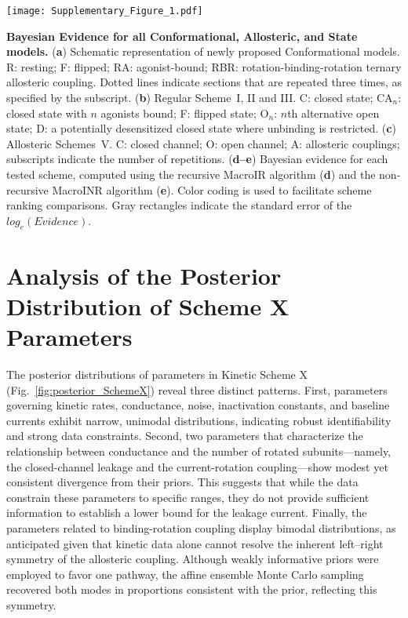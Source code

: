 \documentclass[pdflatex,sn-nature]{sn-jnl}%
\theoremstyle{thmstyleone}%
\theoremstyle{thmstyletwo}%
\theoremstyle{thmstylethree}%
\begin{document}
\begin{extfigure}[t]
	\centering
	\texttt{[image: Supplementary\_Figure\_1.pdf]}
	\caption{\textbf{Bayesian Evidence for all Conformational, Allosteric, and State models.}  
		(\textbf{a}) Schematic representation of newly proposed Conformational models. R: resting; F: flipped; RA: agonist-bound; RBR: rotation-binding-rotation ternary allosteric coupling. Dotted lines indicate sections that are repeated three times, as specified by the subscript.  
		(\textbf{b}) Regular Scheme~I, II and III. C: closed state; CA$_n$: closed state with $n$ agonists bound; F: flipped state; O$_n$: $n$th alternative open state; D: a potentially desensitized closed state where unbinding is restricted.  
		(\textbf{c}) Allosteric Schemes~V. C: closed channel; O: open channel; A: allosteric couplings; subscripts indicate the number of repetitions.  
		(\textbf{d--e}) Bayesian evidence for each tested scheme, computed using the recursive MacroIR algorithm (\textbf{d}) and the non-recursive MacroINR algorithm (\textbf{e}). Color coding is used to facilitate scheme ranking comparisons. Gray rectangles indicate the standard error of the $log_e(Evidence)$.  
	}
	\label{extfig:1}
\end{extfigure}



\section{Analysis of the Posterior Distribution of Scheme X Parameters}

The posterior distributions of parameters in Kinetic Scheme X (Fig.~\ref{fig:posterior_SchemeX}) reveal three distinct patterns. First, parameters governing kinetic rates, conductance, noise, inactivation constants, and baseline currents exhibit narrow, unimodal distributions, indicating robust identifiability and strong data constraints. Second, two parameters that characterize the relationship between conductance and the number of rotated subunits—namely, the closed-channel leakage and the current-rotation coupling—show modest yet consistent divergence from their priors. This suggests that while the data constrain these parameters to specific ranges, they do not provide sufficient information to establish a lower bound for the leakage current. Finally, the parameters related to binding-rotation coupling display bimodal distributions, as anticipated given that kinetic data alone cannot resolve the inherent left–right symmetry of the allosteric coupling. Although weakly informative priors were employed to favor one pathway, the affine ensemble Monte Carlo sampling recovered both modes in proportions consistent with the prior, reflecting this symmetry.
\end{document}
